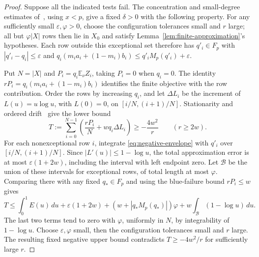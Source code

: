 \begin{proof}
Suppose all the indicated tests fail. The concentration and small-degree
estimates of~\cite[Proposition~3.5, Steps~2 and~5]{ZBS}, using $x<p$,
give a fixed $\delta>0$ with the following property. For any sufficiently
small $\varepsilon,\varphi>0$, choose the configuration tolerances small
and $r$ large; all but $\varphi|X|$ rows then lie in $X_0$ and satisfy
Lemma~\ref{lem:finite-approximation}'s hypotheses. Each row outside this
exceptional set therefore has $q'_i\in F_p$ with $|q'_i-q_i|\le\varepsilon$
and $q_i(m_i a_i+(1-m_i)b_i)\le q'_iM_p(q'_i)+\varepsilon$.

Put $N=|X|$ and $P_i=q_i\mathbb E_\nu Z_i$, taking $P_i=0$ when
$q_i=0$. The identity $rP_i=q_i(m_i a_i+(1-m_i)b_i)$ identifies
the finite objective with the row contribution.
Order the rows by increasing $q_i$, and let $\Delta L_i$ be the
increment of $L(u)=u\log u$, with $L(0)=0$, on $[i/N,(i+1)/N]$.
Stationarity and ordered drift~\cite[Proposition~3.5, Steps~3--4]{ZBS}
give the lower bound
\[
 T:=\sum_{i=0}^{N-1}\left(\frac{rP_i}{N}+wq_i\Delta L_i\right)
 \ge-\frac{4w^2}{r}\qquad(r\ge2w).
\]
For each nonexceptional row $i$, integrate \eqref{eq:negative-envelope}
with $q'_i$ over $[i/N,(i+1)/N]$. Since $|L'(u)|\le1-\log u$, the total
approximation error is at most $\varepsilon(1+2w)$, including the
interval with left endpoint zero. Let $\mathcal B$ be the union of these
intervals for exceptional rows, of total length at most $\varphi$. Comparing there with
any fixed $q_*\in F_p$ and using the blue-failure bound $rP_i\le w$
gives
\[
 T\le\int_0^1E(u)\,du+\varepsilon(1+2w)
 +(w+|q_*M_p(q_*)|)\varphi
 +w\int_{\mathcal B}(1-\log u)\,du.
\]
The last two terms tend to zero with $\varphi$, uniformly in $N$,
by integrability of $1-\log u$. Choose $\varepsilon,\varphi$ small,
then the configuration tolerances small and $r$ large. The resulting
fixed negative upper bound contradicts $T\ge-4w^2/r$ for sufficiently
large $r$.
\end{proof}
